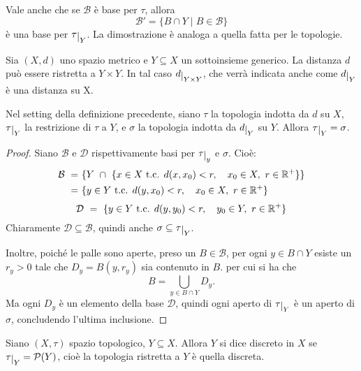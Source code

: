 \documentclass{article}
\begin{document}
\begin{oss}
    Vale anche che se $\mathcal{B}$ \`e base per $\tau$, allora
    \[
    \mathcal{B'} = \{B \cap Y \;|\; B \in \mathcal{B}\}
    \]
    \`e una base per $\tau\restrict{Y}$. La dimostrazione \`e analoga a quella
    fatta per le topologie.
\end{oss}

\begin{defn}
    Sia $(X, d)$ uno spazio metrico e $Y \subseteq X$ un sottoinsieme generico.
    La distanza $d$ pu\`o essere ristretta a $Y \times Y$. In tal caso
    $d\restrict{Y \times Y}$, che verr\`a indicata anche come $d\restrict{Y}$
    \`e una distanza su X.
\end{defn}

\begin{prop}
    Nel setting della definizione precedente, siano $\tau$ la topologia indotta
    da $d$ su $X$, $\tau\restrict{Y}$ la restrizione di $\tau$ a $Y$, e $\sigma$
    la topologia indotta da $d\restrict{Y}$ su $Y$. Allora $\tau\restrict{Y} =
    \sigma$.
\end{prop}

\begin{proof}
    Siano $\mathcal{B}$ e $\mathcal{D}$ rispettivamente basi per
    $\tau\restrict{y}$ e $\sigma$. Cio\`e:
    \begin{align*}
        \mathcal{B}\ =&\ \{Y\ \cap\ \{x \in X \text{ t.c. } d(x, x_0) < r,\quad x_0 \in
        X,\ r \in \mathbb{R}^+\}\}\\
        =&\ \{y \in Y \text{ t.c. } d(y, x_0) < r,\quad x_0 \in X,\ r \in \mathbb{R}^+\}
    \end{align*}
    \[
        \mathcal{D}\ =\ \{y \in Y \text{ t.c. } d(y, y_0) < r,\quad y_0 \in Y,\ r \in
        \mathbb{R}^+\}
    \]
    Chiaramente $\mathcal{D} \subseteq \mathcal{B}$, quindi anche $\sigma
    \subseteq \tau\restrict{Y}$.

    Inoltre, poiché le palle sono aperte, preso un $B \in \mathcal{B}$, per ogni
    $y \in B \cap Y$ esiste un $r_y>0$ tale che $D_y = B(y,r_y)$ sia contenuto
    in $B$. per cui si ha che
    \[
        B = \bigcup_{y \in B \cap Y} D_y.
    \]
    Ma ogni $D_y$ \`e un elemento della base $\mathcal{D}$, quindi ogni aperto
    di $\tau\restrict{Y}$ \`e un aperto di $\sigma$, concludendo l'ultima
    inclusione.
\end{proof}

\begin{defn}
    Siano $(X, \tau)$ spazio topologico, $Y \subseteq X$. Allora $Y$ si dice
    discreto in $X$ se $\tau\restrict{Y} = \mathcal{P}(Y)$, cioè la topologia
    ristretta a $Y$ \`e quella discreta.
\end{defn}
\end{document}
